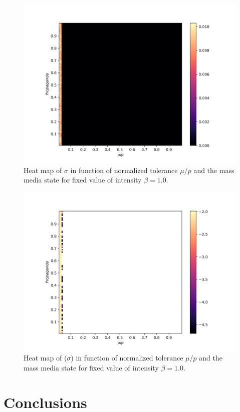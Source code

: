 \documentclass[%
 reprint,
 amsmath,amssymb,
 aps,
]{revtex4-2}
\begin{document}
\begin{figure}
    \centering
    \includegraphics[scale = 0.45]{images/sigma_prop_vs_mu_n1000_p100_i100.png}
    \caption{Heat map of $\sigma$ in function of normalized tolerance $\mu/p$ and the mass media state for fixed value of intensity $\beta = 1.0$.}
    \label{fig:sigma_prop_vs_tolerance_i10}
\end{figure}
\begin{figure}
    \centering
    \includegraphics[scale = 0.45]{images/logsigma_prop_vs_mu_n1000_p100_i100.png}
    \caption{Heat map of \log($\sigma$) in function of normalized tolerance $\mu/p$ and the mass media state for fixed value of intensity $\beta = 1.0$.}
    \label{fig:logsigma_prop_vs_tolerance_i10}
\end{figure}



\section{Conclusions}




\printbibliography{}
\end{document}
